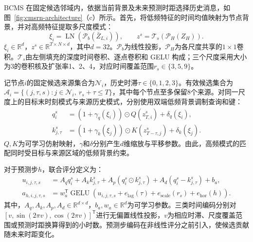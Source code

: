BCMS 在固定候选邻域内，依据当前背景及未来预测时距选择历史消息，如图~\ref{fig:cmsrn-architecture}（c）所示。首先，将低频特征的时间均值映射为节点背景，并对高频特征提取多尺度模式：
\begin{equation}
\label{eq:bcms-context-pattern}
\xi_i=\operatorname{LN}\!\left(\mathcal{P}_b(\bar{Z}_{L,i})\right),
\qquad z^s=\mathcal{T}_s\!\left(\mathcal{P}_H(Z_H)\right).
\end{equation}
\(\xi_i\in\mathbb{R}^{d}\)，\(z^s\in\mathbb{R}^{T\times N\times d}\)，其中\(d=32\)。\(\mathcal{P}_b\)为线性投影，\(\mathcal{P}_H\)为各尺度共享的\(1\times1\)卷积。\(\mathcal{T}_s\)由左侧填充的深度时间卷积、逐点卷积和 GELU 构成；三个尺度采用大小为3的卷积核及扩张率1、2、4，对应时间覆盖范围\(r_s\in\{3,5,9\}\)。

记节点\(i\)的固定候选来源集合为\(\mathcal{N}_i\)，历史时滞\(\tau\in\{0,1,2,3\}\)。有效候选集合为\(\mathcal{A}_i=\{(j,\tau,s):j\in\mathcal{N}_i,\ r_s+\tau\leq T\}\)，其中每个节点至多保留8个来源。对同一尺度上的目标末时刻模式与来源历史模式，分别使用双端低频背景调制查询和键：
\begin{equation}
\label{eq:background-conditioned-qk}
\begin{aligned}
q_i^s&=(1+\gamma_q(\xi_i))\odot Q(z^s_{T,i})+\delta_q(\xi_i),\\
k_{j,\tau}^s&=(1+\gamma_k(\xi_j))\odot K(z^s_{T-\tau,j})+\delta_k(\xi_j).
\end{aligned}
\end{equation}
\(Q,K\)为可学习仿射映射，\(\gamma\)和\(\delta\)分别产生\(d\)维缩放与平移参数。由此，高频模式的匹配同时受目标与来源区域的低频背景约束。

对于预测步\(h\)，联合评分定义为：
\begin{equation}
\label{eq:joint-message-score}
\begin{aligned}
u_{i,j,\tau,s}
&=A_q q_i^s+A_k k_{j,\tau}^s
+A_p(q_i^s\odot k_{j,\tau}^s)+A_d(q_i^s-k_{j,\tau}^s)+b_a,\\
a_{h,i,j,\tau,s}
&=w_a^{\mathsf T}\operatorname{GELU}\!\left(
u_{i,j,\tau,s}+e_{\mathrm{lag}}(\tau)+e_{\mathrm{scale}}(r_s)+e_{\mathrm{hor}}(h)\right).
\end{aligned}
\end{equation}
其中，\(A_q,A_k,A_p,A_d\in\mathbb{R}^{d\times d}\)，\(b_a,w_a\in\mathbb{R}^{d}\)为可学习参数。三类时间编码分别对\([v,\sin(2\pi v),\cos(2\pi v)]^{\mathsf T}\)进行无偏置线性投影，\(v\)为相应时滞、尺度覆盖范围或预测时距换算得到的小时数。预测步编码在非线性评分之前引入，使候选贡献随未来时距变化。

